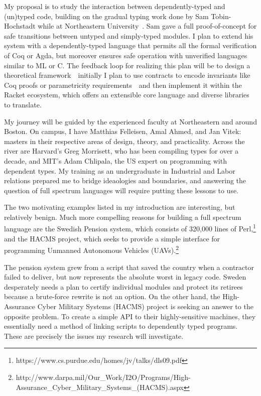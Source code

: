 \documentclass[12pt]{article}
\newcommand{\hdr}[2]{\vspace{-0.4cm}{\flushleft{\hrulefill\\\textbf{#1}\hfill{#2}\\\vspace{-0.2cm}\hrulefill}}\vspace{0.1cm}}
\begin{document}
My proposal is to study the interaction between dependently-typed and (un)typed code, building on the gradual typing work done by Sam Tobin-Hochstadt while at Northeastern University~\cite{tobin2010typed}.
Sam gave a full proof-of-concept for safe transitions between untyped and simply-typed modules.
I plan to extend his system with a dependently-typed language that permits all the formal verification of Coq or Agda, but moreover ensures safe operation with unverified languages similar to ML or C.
The feedback loop for realizing this plan will be to design a theoretical framework~\textemdash~initially I plan to use contracts to encode invariants like Coq proofs or parametricity requirements~\textemdash~and then implement it within the Racket ecosystem, which offers an extensible core language and diverse libraries to translate.

My journey will be guided by the experienced faculty at Northeastern and around Boston.
On campus, I have Matthias Felleisen, Amal Ahmed, and Jan Vitek: masters in their respective areas of design, theory, and practicality.
Across the river are Harvard's Greg Morrisett, who has been compiling types for over a decade, and MIT's Adam Chlipala, the US expert on programming with dependent types.
My training as an undergraduate in Industrial and Labor relations prepared me to bridge ideaologies and boundaries, and answering the question of full spectrum languages will require putting these lessons to use.

\newpage

\hdr{Broader Impacts}{}

The two motivating examples listed in my introduction are interesting, but relatively benign.
Much more compelling reasons for building a full spectrum language are the Swedish Pension system, which consists of 320,000 lines of Perl,\footnote{https://www.cs.purdue.edu/homes/jv/talks/dls09.pdf} and the HACMS project, which seeks to provide a simple interface for programming Unmanned Autonomous Vehicles (UAVs).\footnote{http://www.darpa.mil/Our\_Work/I2O/Programs/High-Assurance\_Cyber\_Military\_Systems\_(HACMS).aspx}

The pension system grew from a script that saved the country when a contractor failed to deliver, but now represents the absolute worst in legacy code.
Sweden desperately needs a plan to certify individual modules and protect its retirees because a brute-force rewrite is not an option.
On the other hand, the High-Assurance Cyber Military Systems (HACMS) project is seeking an answer to the opposite problem.
To create a simple API to their highly-sensitive machines, they essentially need a method of linking scripts to dependently typed programs.
These are precisely the issues my research will investigate.
\end{document}
